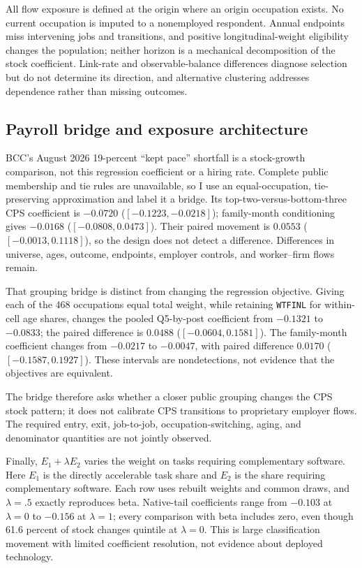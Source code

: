 All flow exposure is defined at the origin where an origin occupation exists.  No current occupation is imputed to a nonemployed respondent.  Annual endpoints miss intervening jobs and transitions, and positive longitudinal-weight eligibility changes the population; neither horizon is a mechanical decomposition of the stock coefficient.  Link-rate and observable-balance differences diagnose selection but do not determine its direction, and alternative clustering addresses dependence rather than missing outcomes.

\subsection{Payroll bridge and exposure architecture}

BCC's August 2026 19-percent ``kept pace'' shortfall is a stock-growth comparison, not this regression coefficient or a hiring rate.  Complete public membership and tie rules are unavailable, so I use an equal-occupation, tie-preserving approximation and label it a bridge.  Its top-two-versus-bottom-three CPS coefficient is $-0.0720$ ($[-0.1223,-0.0218]$); family-month conditioning gives $-0.0168$ ($[-0.0808,0.0473]$).  Their paired movement is $0.0553$ ($[-0.0013,0.1118]$), so the design does not detect a difference.  Differences in universe, ages, outcome, endpoints, employer controls, and worker--firm flows remain.

That grouping bridge is distinct from changing the regression objective.  Giving each of the 468 occupations equal total weight, while retaining \texttt{WTFINL} for within-cell age shares, changes the pooled Q5-by-post coefficient from $-0.1321$ to $-0.0833$; the paired difference is $0.0488$ ($[-0.0604,0.1581]$).  The family-month coefficient changes from $-0.0217$ to $-0.0047$, with paired difference $0.0170$ ($[-0.1587,0.1927]$).  These intervals are nondetections, not evidence that the objectives are equivalent.

The bridge therefore asks whether a closer public grouping changes the CPS stock pattern; it does not calibrate CPS transitions to proprietary employer flows.  The required entry, exit, job-to-job, occupation-switching, aging, and denominator quantities are not jointly observed.

Finally, $E_1+\lambda E_2$ varies the weight on tasks requiring complementary software.  Here $E_1$ is the directly accelerable task share and $E_2$ is the share requiring complementary software.  Each row uses rebuilt weights and common draws, and $\lambda=.5$ exactly reproduces beta.  Native-tail coefficients range from $-0.103$ at $\lambda=0$ to $-0.156$ at $\lambda=1$; every comparison with beta includes zero, even though 61.6 percent of stock changes quintile at $\lambda=0$.  This is large classification movement with limited coefficient resolution, not evidence about deployed technology.

